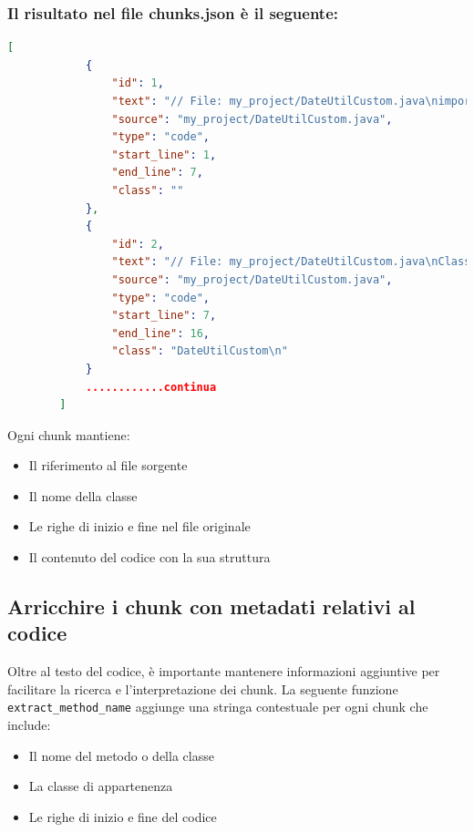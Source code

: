 \documentclass[12pt,a4paper,openright,twoside]{book}
\begin{document}
\subsubsection{Il risultato nel file chunks.json è il seguente:}
    \begin{lstlisting}[language=json,firstnumber=1, caption={Esempio di chunks generati}, label={lst:chunks-example}]
        [
            {
                "id": 1,
                "text": "// File: my_project/DateUtilCustom.java\nimport java.text.ParseException;\nimport java.text.SimpleDateFormat;\nimport java.time.DayOfWeek;\nimport java.time.LocalDate;\nimport java.time.format.DateTimeParseException;\nimport java.util.Calendar;\nimport java.util.Date;",
                "source": "my_project/DateUtilCustom.java",
                "type": "code",
                "start_line": 1,
                "end_line": 7,
                "class": ""
            },
            {
                "id": 2,
                "text": "// File: my_project/DateUtilCustom.java\nClasse: DateUtilCustom\nimport java.util.Calendar;\nimport java.util.Date;\nimport java.util.concurrent.TimeUnit;\npublic class DateUtilCustom {\n    /**\n     * Formatta una data nel formato \"dd/MM/yyyy\".\n     *\n     * @param date La data da formattare.",
                "source": "my_project/DateUtilCustom.java",
                "type": "code",
                "start_line": 7,
                "end_line": 16,
                "class": "DateUtilCustom\n"
            }
            ............continua
        ]
    \end{lstlisting}
        
    Ogni chunk mantiene:
    \begin{itemize}
        \item Il riferimento al file sorgente
        \item Il nome della classe
        \item Le righe di inizio e fine nel file originale
        \item Il contenuto del codice con la sua struttura
    \end{itemize}

\subsection{Arricchire i chunk con metadati relativi al codice}
    Oltre al testo del codice, è importante mantenere informazioni aggiuntive per facilitare la ricerca e l'interpretazione dei chunk.
    La seguente funzione \texttt{extract\_method\_name} aggiunge una stringa contestuale per ogni chunk che include:
    \begin{itemize}
        \item Il nome del metodo o della classe
        \item La classe di appartenenza
        \item Le righe di inizio e fine del codice
    \end{itemize}
\end{document}
